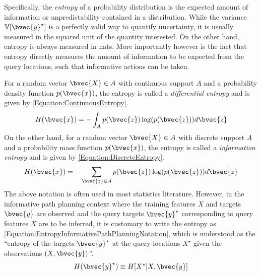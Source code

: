 			Specifically, the \textit{entropy} of a probability distribution is the expected amount of information or unpredictability contained in a distribution. While the variance $\mathbb{V}[\bvec{y}^{\star}]$ is a perfectly valid way to quantify uncertainty, it is usually measured in the squared unit of the quantity interested. On the other hand, entropy is always measured in nats. More importantly however is the fact that entropy directly measures the amount of information to be expected from the query locations, such that informative actions can be taken.
			
			For a random vector $\bvec{X} \in A$ with continuous support $A$ and a probability density function $p(\bvec{x})$, the entropy is called a \textit{differential entropy} and is given by \eqref{Equation:ContinuousEntropy}. \begin{equation}
				H(\bvec{x}) = - \int_{A} p(\bvec{z}) \log(p(\bvec{z})) d\bvec{z}
			\label{Equation:ContinuousEntropy}
			\end{equation} On the other hand, for a random vector $\bvec{X} \in A$ with discrete support $A$ and a probability mass function $p(\bvec{x})$, the entropy is called a \textit{information entropy} \cite{ShannonEntropy} and is given by \eqref{Equation:DiscreteEntropy}. \begin{equation}
				H(\bvec{x}) = - \sum_{\bvec{z} \in A} p(\bvec{z}) \log(p(\bvec{z})) d\bvec{z}
			\label{Equation:DiscreteEntropy}
			\end{equation} The above notation is often used in most statistics literature. However, in the informative path planning context where the training features $X$ and targets $\bvec{y}$ are observed and the query targets $\bvec{y}^{\star}$ corresponding to query features $X$ are to be inferred, it is customary to write the entropy as \eqref{Equation:EntropyInformativePathPlanningNotation}, which is understood as the ``entropy of the targets $\bvec{y}^{\star}$ at the query locations $X^{\star}$ given the observations $(X, \bvec{y})$''. \begin{equation}
				H(\bvec{y}^{\star}) \equiv H[X^{\star} | X, \bvec{y}]
			\label{Equation:EntropyInformativePathPlanningNotation}
			\end{equation}
			
%	
%		
		
